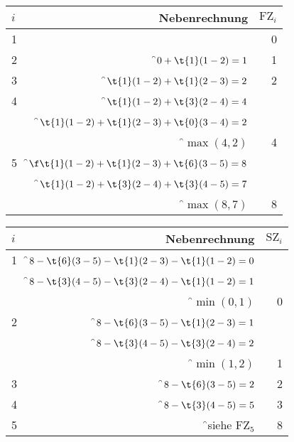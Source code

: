 \documentclass{lehramt-informatik-aufgabe}
\begin{document}
\begin{enumerate}
\begin{liAntwort}
%


\begin{tabular}{|l|r|r|}
\hline
$i$ & Nebenrechnung & $\text{FZ}_i$\\
\hline\hline
1             &                                                & 0 \\\hline
2             & \f$0 + \t{1}(1-2) = 1$                         & 1 \\\hline
3             & \f$\t{1}(1-2) + \t{1}(2-3) = 2$                & 2 \\\hline
4             & \f$\t{1}(1-2) + \t{3}(2-4) = 4$                & \\
              & \f$\t{1}(1-2) + \t{1}(2-3) + \t{0}(3-4) = 2$   & \\
              & \f$\max(4,2)$                                  & 4 \\\hline
5             & \f$\f\t{1}(1-2) + \t{1}(2-3) + \t{6}(3-5) = 8$ & \\
              & \f$\t{1}(1-2) + \t{3}(2-4) + \t{3}(4-5) = 7$   & \\
              & \f$\max(8,7)$                                  & 8 \\\hline
\end{tabular}

%


\begin{tabular}{|l|r|r|}
\hline
$i$ & Nebenrechnung & $\text{SZ}_i$\\
\hline\hline
1             & \f$8 - \t{6}(3-5) - \t{1}(2-3) - \t{1}(1-2) = 0$ & \\
              & \f$8 - \t{3}(4-5) - \t{3}(2-4) - \t{1}(1-2) = 1$ & \\
              & \f$\min(0,1)$ & 0 \\\hline

2             & \f$8 - \t{6}(3-5) - \t{1}(2-3) = 1$ & \\
              & \f$8 - \t{3}(4-5) - \t{3}(2-4) = 2$ & \\
              & \f$\min(1,2)$ & 1 \\\hline

3             & \f$8 - \t{6}(3-5) = 2$ & 2  \\\hline

4             & \f$8 - \t{3}(4-5) = 5$      & 3 \\\hline
5             & \f{}siehe $\text{FZ}_5$  & 8 \\\hline
\end{tabular}
\end{liAntwort}


\end{enumerate}
\end{document}
